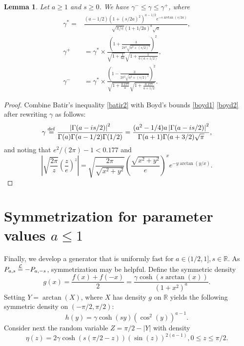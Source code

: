 \documentclass[12pt,reqno,tbtags]{amsart}
\newcommand{\inlaw}{\buildrel {\mathcal L} \over =}
\newcommand{\RR}{\mathbb{R}}
\newcommand{\isdef}{\buildrel {\rm def} \over =}
\newtheorem{lemma}{Lemma}
\begin{document}
\begin{lemma}\label{gamma}
Let $a \ge 1$ and $s \ge 0$. We have $\gamma^- \le \gamma \le \gamma^+$, where
\begin{align}\label{gammabounds}
\gamma^* 
=& 
\frac{
(a-1/2) \left( 1 + (s/2a)^2  \right)^{a-1/2} e^{-s \arctan (s/2a) } 
}{
\sqrt{\pi/e} \left(  1+1/2a  \right)^a  \sqrt{a} } , \\
\gamma^+ &= \gamma^* \times \frac{ \left (1 + \frac{3 }{ 2 \pi^2 \sqrt{a^2 + (s/2)^2 }} \right)^2  }{ \sqrt{ 1 + \frac{1 }{ 6a}}
\sqrt{ 1 + \frac{1 }{ 6(a+1/2)}} } ,\\
\gamma^- &= \gamma^* \times \frac{ \left (1 - \frac{3 }{ 2 \pi^2 \sqrt{a^2 + (s/2)^2 }} \right)^2  }
{ \sqrt{ 1 + \frac{0.177 }{ a}}  \sqrt{ 1 + \frac{0.177 }{ a+1/2}} }. 
\end{align}
\end{lemma}

\begin{proof}
Combine Batir's inequality \eqref{batir2} with Boyd's bounds \eqref{boyd1} \eqref{boyd2} after re\-wri\-ting $\gamma$ as follows: 
$$
\gamma 
\isdef  \frac{ \left|  \Gamma (a - is/2) \right|^2  }{ \Gamma (a) \Gamma (a -1/2) \Gamma (1/2) }
=  \frac{ (a^2 - 1/4) a \left| \Gamma (a - is/2) \right|^2  }{ \Gamma (a+1) \Gamma (a+3/2) \sqrt{\pi} },
$$
and noting that
$e^2/(2\pi) -1 < 0.177$ and
\begin{equation}
\left|  \sqrt{\frac{2 \pi }{ z}} \left( \frac{ z }{ e } \right)^{z} \right|  
= \sqrt{ \frac{ 2 \pi }{ \sqrt{x^2 + y^2} }} \left( \frac{ \sqrt{x^2 + y^2} }{ e } \right)^{x} e^{-y \arctan (y/x) }.
\end{equation}
\end{proof}



\section{Symmetrization for parameter values $a \le 1$}\label{symmetric}

Finally, we develop a generator that is uniformly fast for $a \in (1/2,1], s \in \RR$.
As $P_{a,s} \inlaw -P_{a, -s}$, symmetrization may be helpful.
Define the symmetric density
$$
g(x) = \frac{f(x) + f(-x) }{ 2} = \frac{\gamma  \cosh ( s \arctan (x) ) }{ (1+x^2)^a }.
$$
Setting $Y=\arctan (X)$, where $X$ has density $g$ on $\RR$ yields the following 
symmetric density on $(-\pi/2, \pi/2)$:
$$
h(y) =  \gamma \cosh (sy) ( \cos^2 (y) )^{a-1}.
$$
Consider next the random variable $Z = \pi/2 - |Y|$
with density
\begin{equation}\label{eta}
\eta (z) =  2\gamma \cosh (s (\pi/2 -z)) ( \sin (z) )^{2(a-1)}, 0 \le z \le \pi/2.
\end{equation}
\end{document}
